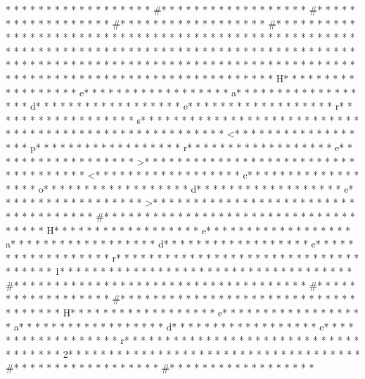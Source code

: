 * * *  * * *  * * *  *  * * *  *  * * *  * #* * *  * * *  * * *  *  * * *  *  * * *  * #* * *  * * *  * * *  *  * * *  *  * * *  * #* * *  * * *  * * *  *  * * *  *  * * *  * #* * *  * * *  * * *  *  * * *  *  * * *  *  * * *  * * *  * * *  *  * * *  *  * * *  * * *  * * *  *  * * *  *  * * *  * * *  * * *  *  * * *  *  * * *  *  * * *  * * *  * * *  *  * * *  *  * * *  *  * * *  * * *  * * *  *  * * *  *  * * *  *  * * *  * * *  * * *  *  * * *  *  * * *  *  * * *  * * *  * * *  *  * * *  *  * * *  *  * * *  * * *  * * *  *  * * *  *  * * *  * {* * *  * * *  * * *  *  * * *  *  * * *  * H* * *  * * *  * * *  *  * * *  *  * * *  * e* * *  * * *  * * *  *  * * *  *  * * *  * a* * *  * * *  * * *  *  * * *  *  * * *  * d* * *  * * *  * * *  *  * * *  *  * * *  * e* * *  * * *  * * *  *  * * *  *  * * *  * r* * *  * * *  * * *  *  * * *  *  * * *  * s* * *  * * *  * * *  *  * * *  *  * * *  * }* * *  * * *  * * *  *  * * *  *  * * *  * 
* * *  * * *  * * *  *  * * *  *  * * *  * <* * *  * * *  * * *  *  * * *  *  * * *  * p* * *  * * *  * * *  *  * * *  *  * * *  * r* * *  * * *  * * *  *  * * *  *  * * *  * e* * *  * * *  * * *  *  * * *  *  * * *  * >* * *  * * *  * * *  *  * * *  *  * * *  * 
* * *  * * *  * * *  *  * * *  *  * * *  * <* * *  * * *  * * *  *  * * *  *  * * *  * c* * *  * * *  * * *  *  * * *  *  * * *  * o* * *  * * *  * * *  *  * * *  *  * * *  * d* * *  * * *  * * *  *  * * *  *  * * *  * e* * *  * * *  * * *  *  * * *  *  * * *  * >* * *  * * *  * * *  *  * * *  *  * * *  * 
* * *  * * *  * * *  *  * * *  *  * * *  * #* * *  * * *  * * *  *  * * *  *  * * *  *  * * *  * * *  * * *  *  * * *  *  * * *  * H* * *  * * *  * * *  *  * * *  *  * * *  * e* * *  * * *  * * *  *  * * *  *  * * *  * a* * *  * * *  * * *  *  * * *  *  * * *  * d* * *  * * *  * * *  *  * * *  *  * * *  * e* * *  * * *  * * *  *  * * *  *  * * *  * r* * *  * * *  * * *  *  * * *  *  * * *  *  * * *  * * *  * * *  *  * * *  *  * * *  * 1* * *  * * *  * * *  *  * * *  *  * * *  *  * * *  * * *  * * *  *  * * *  *  * * *  * #* * *  * * *  * * *  *  * * *  *  * * *  * 
* * *  * * *  * * *  *  * * *  *  * * *  * #* * *  * * *  * * *  *  * * *  *  * * *  * #* * *  * * *  * * *  *  * * *  *  * * *  *  * * *  * * *  * * *  *  * * *  *  * * *  * H* * *  * * *  * * *  *  * * *  *  * * *  * e* * *  * * *  * * *  *  * * *  *  * * *  * a* * *  * * *  * * *  *  * * *  *  * * *  * d* * *  * * *  * * *  *  * * *  *  * * *  * e* * *  * * *  * * *  *  * * *  *  * * *  * r* * *  * * *  * * *  *  * * *  *  * * *  *  * * *  * * *  * * *  *  * * *  *  * * *  * 2* * *  * * *  * * *  *  * * *  *  * * *  *  * * *  * * *  * * *  *  * * *  *  * * *  * #* * *  * * *  * * *  *  * * *  *  * * *  * #* * *  * * *  * * *  *  * * *  *  * * *  * 
